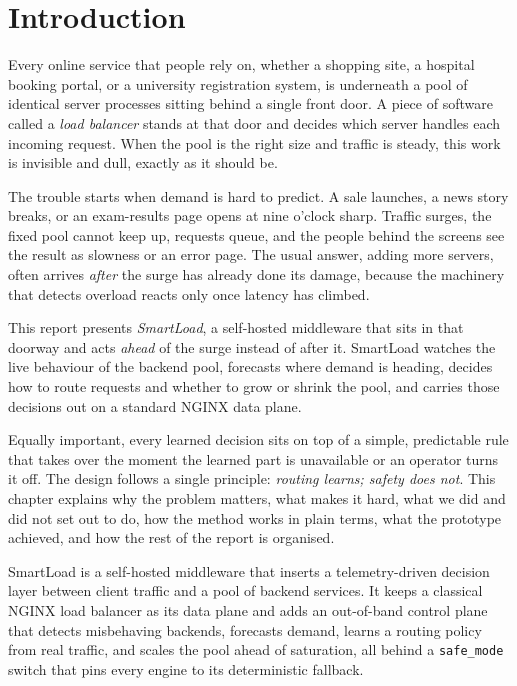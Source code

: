 \chapter{Introduction}
\label{ch:intro}

Every online service that people rely on, whether a shopping site, a hospital
booking portal, or a university registration system, is underneath a pool of
identical server processes sitting behind a single front door. A piece of
software called a \emph{load balancer} stands at that door and decides which
server handles each incoming request. When the pool is the right size and
traffic is steady, this work is invisible and dull, exactly as it should be.

The trouble starts when demand is hard to predict. A sale launches, a news story
breaks, or an exam-results page opens at nine o'clock sharp. Traffic surges, the
fixed pool cannot keep up, requests queue, and the people behind the screens see
the result as slowness or an error page. The usual answer, adding more servers,
often arrives \emph{after} the surge has already done its damage, because the
machinery that detects overload reacts only once latency has climbed.

This report presents \emph{SmartLoad}, a self-hosted middleware that sits in that
doorway and acts \emph{ahead} of the surge instead of after it. SmartLoad watches
the live behaviour of the backend pool, forecasts where demand is heading,
decides how to route requests and whether to grow or shrink the pool, and carries
those decisions out on a standard NGINX \cite{nginx} data plane.

Equally important, every learned decision sits on top of a simple, predictable
rule that takes over the moment the learned part is unavailable or an operator
turns it off. The design follows a single principle: \emph{routing learns; safety
does not}. This chapter explains why the problem matters, what makes it hard,
what we did and did not set out to do, how the method works in plain terms, what
the prototype achieved, and how the rest of the report is organised.

SmartLoad is a self-hosted middleware that inserts a telemetry-driven decision
layer between client traffic and a pool of backend services. It keeps a classical
NGINX load balancer as its data plane and adds an out-of-band control plane that
detects misbehaving backends, forecasts demand, learns a routing policy from real
traffic, and scales the pool ahead of saturation, all behind a \texttt{safe\_mode}
switch that pins every engine to its deterministic fallback.

